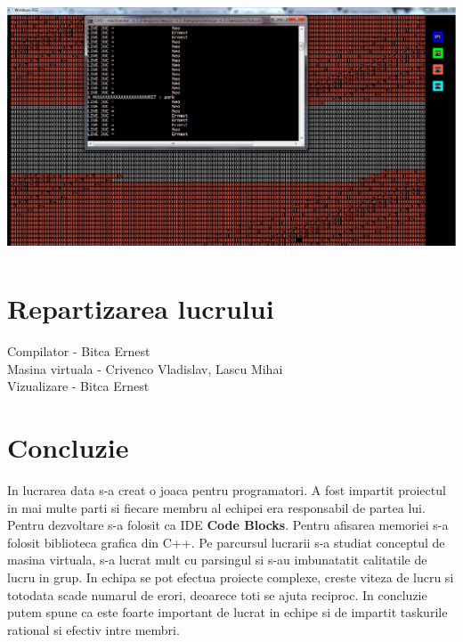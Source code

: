 \begin{center}
\includegraphics[width=14cm, height=7.5cm]{4.eps}
\end{center}

\section*{Repartizarea lucrului}

Compilator - Bitca Ernest
~\\
Masina virtuala - Crivenco Vladislav, Lascu Mihai
~\\
Vizualizare - Bitca Ernest

\section*{Concluzie}

\tab In lucrarea data s-a creat o joaca pentru programatori. A fost impartit proiectul in mai multe parti si fiecare membru
al echipei era responsabil de partea lui. Pentru dezvoltare s-a folosit ca IDE \textbf{Code Blocks}. Pentru afisarea memoriei s-a
folosit biblioteca grafica din C++. Pe parcursul lucrarii s-a studiat conceptul de masina virtuala, s-a lucrat mult cu parsingul si
s-au imbunatatit calitatile de lucru in grup. In echipa se pot efectua proiecte complexe, creste viteza de lucru si totodata scade numarul
de erori, deoarece toti se ajuta reciproc. In concluzie putem spune ca este foarte important de lucrat in echipe si de impartit taskurile 
rational si efectiv intre membri.
